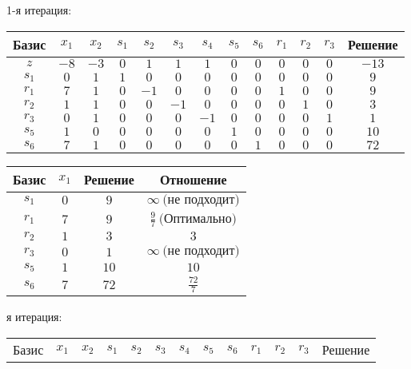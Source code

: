\documentclass{article}%
\begin{document}
\begin{flushleft}%
1{-}я итерация: %
\newline%
\newline%
\renewcommand{\arraystretch}{1.3}%
\begin{tabular}{|c|ccccccccccc|c|}%
\hline%
Базис&$x_{1}$&$x_{2}$&$s_{1}$&$s_{2}$&$s_{3}$&$s_{4}$&$s_{5}$&$s_{6}$&$r_{1}$&$r_{2}$&$r_{3}$&Решение\\%
\hline%
$z$&$-8$&$-3$&$0$&$1$&$1$&$1$&$0$&$0$&$0$&$0$&$0$&$-13$\\%
\hline%
$s_{1}$&$0$&$1$&$1$&$0$&$0$&$0$&$0$&$0$&$0$&$0$&$0$&$9$\\%
$r_{1}$&$7$&$1$&$0$&$-1$&$0$&$0$&$0$&$0$&$1$&$0$&$0$&$9$\\%
$r_{2}$&$1$&$1$&$0$&$0$&$-1$&$0$&$0$&$0$&$0$&$1$&$0$&$3$\\%
$r_{3}$&$0$&$1$&$0$&$0$&$0$&$-1$&$0$&$0$&$0$&$0$&$1$&$1$\\%
$s_{5}$&$1$&$0$&$0$&$0$&$0$&$0$&$1$&$0$&$0$&$0$&$0$&$10$\\%
$s_{6}$&$7$&$1$&$0$&$0$&$0$&$0$&$0$&$1$&$0$&$0$&$0$&$72$\\%
\hline%
\end{tabular}%
\newline%
\newline%
\newline%
\begin{tabular}{|cccc|}%
\hline%
Базис&$x_{1}$&Решение&Отношение\\%
\hline%
$s_{1}$&$0$&$9$&$\infty \: \text{(не подходит)}$\\%
$r_{1}$&$7$&$9$&$\frac{9}{7}\: \text{(Оптимально)}$\\%
$r_{2}$&$1$&$3$&$3$\\%
$r_{3}$&$0$&$1$&$\infty \: \text{(не подходит)}$\\%
$s_{5}$&$1$&$10$&$10$\\%
$s_{6}$&$7$&$72$&$\frac{72}{7}$\\%
\hline%
\end{tabular}%
\newline%
\newline%
я итерация: %
\newline%
\newline%
\renewcommand{\arraystretch}{1.3}%
\begin{tabular}{|c|ccccccccccc|c|}%
\hline%
Базис&$x_{1}$&$x_{2}$&$s_{1}$&$s_{2}$&$s_{3}$&$s_{4}$&$s_{5}$&$s_{6}$&$r_{1}$&$r_{2}$&$r_{3}$&Решение\\%

\end{tabular}
\end{flushleft}
\end{document}
